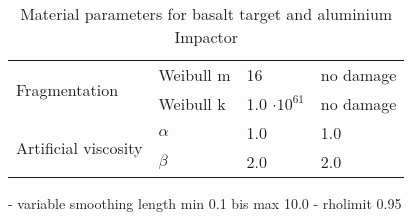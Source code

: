 \begin{table}
\begin{tabular}{ |l|l|l|l| }
        \multirow{2}{*}{Fragmentation}        & Weibull m             & 16                               & no damage                        \\
                                              & Weibull k             & 1.0 $\cdot 10^{61}$              & no damage                        \\ \hline
        \multirow{2}{*}{Artificial viscosity} & $\alpha$              & 1.0                              & 1.0                              \\
                                              & $\beta$               & 2.0                              & 2.0                              \\ \hline
        \hline
    \end{tabular}
    \caption{Material parameters for basalt target and aluminium Impactor}
    \label{fig:material_parameters}
\end{table}

- variable smoothing length min 0.1 bis max 10.0
- rholimit 0.95